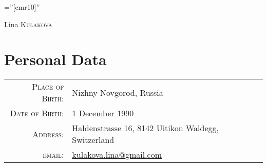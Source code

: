 \documentclass[a4paper,10pt]{article}
\begin{document}
\pagestyle{empty} %

\font\fb=''[cmr10]'' %

\par{%
		{\Huge Lina \textsc{Kulakova}
	}\bigskip\par}

	
\section{Personal Data}

\rm

\begin{tabular}{rl}
    \textsc{Place of Birth:} & Nizhny Novgorod, Russia \\
    \textsc{Date of Birth:} & 1 December 1990 \\
    \textsc{Address:}   & Haldenstrasse 16, 8142 Uitikon Waldegg, Switzerland \\
    \textsc{email:}     & \href{mailto:kulakova.lina@gmail.com}{kulakova.lina@gmail.com}
\end{tabular}

\end{document}
